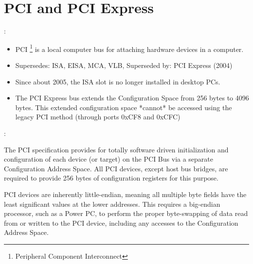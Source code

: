 \section{PCI and PCI Express}
\begin{note}:
\begin{itemize}
	\item PCI \footnote{Peripheral Component Interconnect} is a local computer bus for attaching hardware devices in a computer.
	\item Supersedes: ISA, EISA, MCA, VLB, Superseded by: PCI Express (2004)
	\item Since about 2005, the ISA slot is no longer installed in desktop PCs.
	\item The PCI Express bus extends the Configuration Space from 256 bytes to 4096 bytes. This extended configuration space *cannot* be accessed using the legacy PCI method (through ports 0xCF8 and 0xCFC)
\end{itemize}
\end{note}
\begin{note}:
	
The PCI specification provides for totally software driven initialization and configuration of each device (or target) on the PCI Bus via a separate Configuration Address Space. All PCI devices, except host bus bridges, are required to provide 256 bytes of configuration registers for this purpose.

PCI devices are inherently little-endian, meaning all multiple byte fields have the least significant values at the lower addresses. This requires a big-endian processor, such as a Power PC, to perform the proper byte-swapping of data read from or written to the PCI device, including any accesses to the Configuration Address Space.\\
\end{note}
